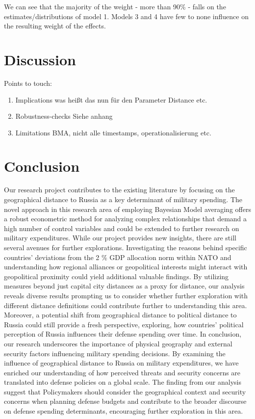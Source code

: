 \documentclass[12pt,a4paper]{article}
\begin{document}
We can see that the majority of the weight - more than 90\% - falls on the estimates/distributions of model 1. Models 3 and 4 have few to none influence on the resulting weight of the effects. 

\section{Discussion}
Points to touch: 
\begin{enumerate}
\item Implications  was heißt das nun für den Parameter Distance etc. 
\item Robustness-checks  Siehe anhang
\item Limitations BMA, nicht alle timestamps, operationalisierung etc. 
\end{enumerate}
\clearpage
\section{Conclusion}

Our research project contributes to the existing literature by focusing on the geographical distance to Russia as a key determinant of military spending. The novel approach in this research area of employing Bayesian Model averaging offers a robust econometric method for analyzing complex relationships that demand a high number of control variables and could be extended to further research on military expenditures. 
While our project provides new insights, there are still several avenues for further explorations. Investigating the reasons behind specific countries’ deviations from the 2 \% GDP allocation norm within NATO and understanding how regional alliances or geopolitical interests might interact with geopolitical proximity could yield additional valuable findings. 
By utilizing measures beyond just capital city distances as a proxy for distance, our analysis reveals diverse results prompting us to consider whether further exploration with different distance definitions could contribute further to understanding this area. Moreover, a potential shift from geographical distance to political distance to Russia could still provide a fresh perspective, exploring, how countries’ political perception of Russia influences their defense spending over time.
In conclusion, our research underscores the importance of physical geography and external security factors influencing military spending decisions. By examining the influence of geographical distance to Russia on military expenditures, we have enriched our understanding of how perceived threats and security concerns are translated into defense policies on a global scale. The finding from our analysis suggest that Policymakers should consider the geographical context and security concerns when planning defense budgets and contribute to the broader discourse on defense spending determinants, encouraging further exploration in this area.
\end{document}
